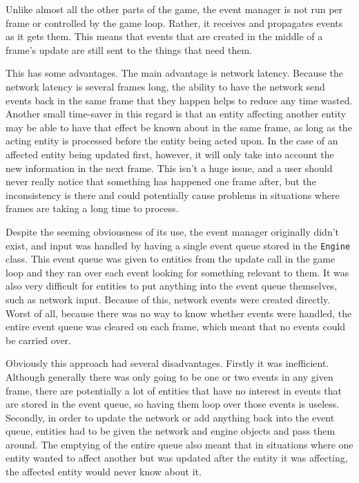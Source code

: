 Unlike almost all the other parts of the game, the event manager is not run per frame or controlled by the game loop. Rather, it receives and propagates events as it gets them. This means that events that are created in the middle of a frame's update are still sent to the things that need them.

This has some advantages. The main advantage is network latency. Because the network latency is several frames long, the ability to have the network send events back in the same frame that they happen helps to reduce any time wasted. Another small time-saver in this regard is that an entity affecting another entity may be able to have that effect be known about in the same frame, as long as the acting entity is processed before the entity being acted upon. In the case of an affected entity being updated first, however, it will only take into account the new information in the next frame. This isn't a huge issue, and a user should never really notice that something has happened one frame after, but the inconsistency is there and could potentially cause problems in situations where frames are taking a long time to process.

Despite the seeming obviousness of its use, the event manager originally didn't exist, and input was handled by having a single event queue stored in the \texttt{Engine} class. This event queue was given to entities from the update call in the game loop and they ran over each event looking for something relevant to them. It was also very difficult for entities to put anything into the event queue themselves, such as network input. Because of this, network events were created directly. Worst of all, because there was no way to know whether events were handled, the entire event queue was cleared on each frame, which meant that no events could be carried over.

Obviously this approach had several disadvantages. Firstly it was inefficient. Although generally there was only going to be one or two events in any given frame, there are potentially a lot of entities that have no interest in events that are stored in the event queue, so having them loop over those events is useless. Secondly, in order to update the network or add anything back into the event queue, entities had to be given the network and engine objects and pass them around. The emptying of the entire queue also meant that in situations where one entity wanted to affect another but was updated after the entity it was affecting, the affected entity would never know about it.

